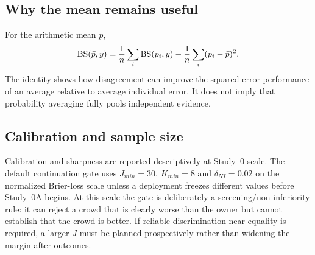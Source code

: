 \subsection{Why the mean remains useful}
For the arithmetic mean $\bar p$,
\[
\mathrm{BS}(\bar p,y)
=
\frac1n\sum_i \mathrm{BS}(p_i,y)
-
\frac1n\sum_i(p_i-\bar p)^2.
\]
The identity shows how disagreement can improve the squared-error performance of an average relative to average individual error. It does not imply that probability averaging fully pools independent evidence.

\subsection{Calibration and sample size}
Calibration and sharpness are reported descriptively at Study~0 scale. The default continuation gate uses $J_{min}=30$, $K_{min}=8$ and $\delta_{NI}=0.02$ on the normalized Brier-loss scale unless a deployment freezes different values before Study~0A begins. At this scale the gate is deliberately a screening/non-inferiority rule: it can reject a crowd that is clearly worse than the owner but cannot establish that the crowd is better. If reliable discrimination near equality is required, a larger $J$ must be planned prospectively rather than widening the margin after outcomes.
